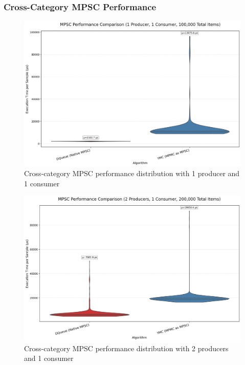 \subsubsection{Cross-Category MPSC Performance}
\begin{figure}[H]
\centering
\caption{Cross-category MPSC performance distribution with 1 producer and 1 consumer}
\label{fig:cross-mpsc-violin-1p}
\includegraphics[width=\textwidth]{images/results/best_in_mpsc_performance_violin_1P1C.png}
\end{figure}

\begin{figure}[H]
\centering
\caption{Cross-category MPSC performance distribution with 2 producers and 1 consumer}
\label{fig:cross-mpsc-violin-2p}
\includegraphics[width=\textwidth]{images/results/best_in_mpsc_performance_violin_2P1C.png}
\end{figure}

